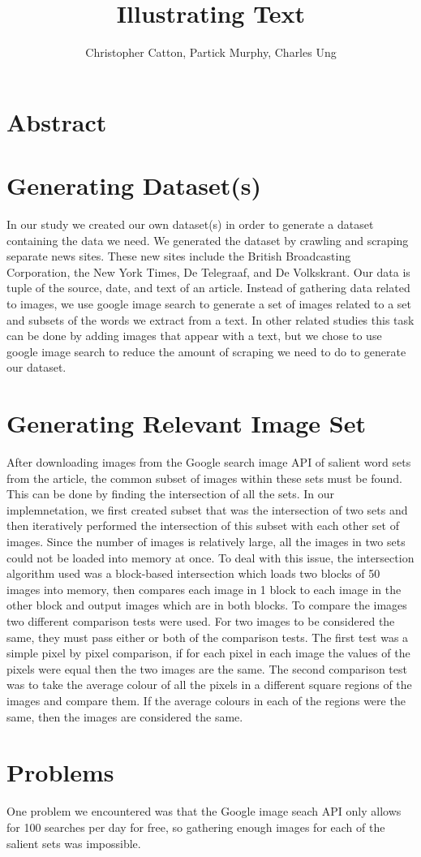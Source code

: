 \documentclass[12pt]{article}
\title{Illustrating Text}
\author{Christopher Catton, Partick Murphy, Charles Ung}
\begin{document}
\section{Abstract}
\section{Generating Dataset(s)}
In our study we created our own dataset(s) in order to generate a dataset containing the data we need. We generated the dataset by crawling and scraping separate news sites. These new sites include the British Broadcasting Corporation, the New York Times, De Telegraaf, and De Volkskrant. Our data is tuple of the source, date, and text of an article.
Instead of gathering data related to images, we use google image search to generate a set of images related to a set and subsets of the words we extract from a text. In other related studies this task can be done by adding images that appear with a text, but we chose to use google image search to reduce the amount of scraping we need to do to generate our dataset.
\section{Generating Relevant Image Set}
After downloading images from the Google search image API of salient word sets from the article, the common subset of images within these sets must be found. This can be done by finding the intersection of all the sets. In our implemnetation, we first created subset that was the intersection of two sets and then iteratively performed the intersection of this subset with each other set of images.
Since the number of images is relatively large, all the images in two sets could not be loaded into memory at once. To deal with this issue, the intersection algorithm used was a block-based intersection which loads two blocks of 50 images into memory, then compares each image in 1 block to each image in the other block and output images which are in both blocks.
To compare the images two different comparison tests were used. For two images to be considered the same, they must pass either or both of the comparison tests. The first test was a simple pixel by pixel comparison, if for each pixel in each image the values of the pixels were equal then the two images are the same. The second comparison test was to take the average colour of all the pixels in a different square regions of the images and compare them. If the average colours in each of the regions were the same, then the images are considered the same.
\section{Problems}
One problem we encountered was that the Google image seach API only allows for 100 searches per day for free, so gathering enough images for each of the salient sets was impossible.
\end{document}
